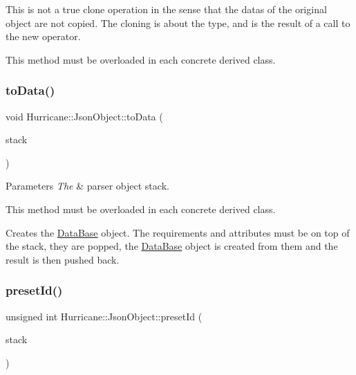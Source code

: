 This is not a true clone operation in the sense that the datas of the original object are not copied. The cloning is about the type, and is the result of a call to the {\ttfamily new} operator.

This method must be overloaded in each concrete derived class. \mbox{\label{classHurricane_1_1JsonObject_a57a845ca64ac8912b35c4dbf75723af6}} 
\subsubsection{\texorpdfstring{to\+Data()}{toData()}}
{\footnotesize\ttfamily void Hurricane\+::\+Json\+Object\+::to\+Data (\begin{DoxyParamCaption}\item[{\mbox{\hyperlink{classHurricane_1_1JsonStack}{Json\+Stack}} \&}]{stack }\end{DoxyParamCaption})\hspace{0.3cm}{\ttfamily [virtual]}}


\begin{DoxyParams}{Parameters}
{\em The} & parser object stack.\\
\hline
\end{DoxyParams}
This method must be overloaded in each concrete derived class.

Creates the \mbox{\hyperlink{classHurricane_1_1DataBase}{Data\+Base}} object. The requirements and attributes must be on top of the stack, they are popped, the \mbox{\hyperlink{classHurricane_1_1DataBase}{Data\+Base}} object is created from them and the result is then pushed back. \mbox{\label{classHurricane_1_1JsonObject_a3819d0c96ee99277e4cc8d349dc4155c}} 
\subsubsection{\texorpdfstring{preset\+Id()}{presetId()}}
{\footnotesize\ttfamily unsigned int Hurricane\+::\+Json\+Object\+::preset\+Id (\begin{DoxyParamCaption}\item[{\mbox{\hyperlink{classHurricane_1_1JsonStack}{Json\+Stack}} \&}]{stack }\end{DoxyParamCaption})}


